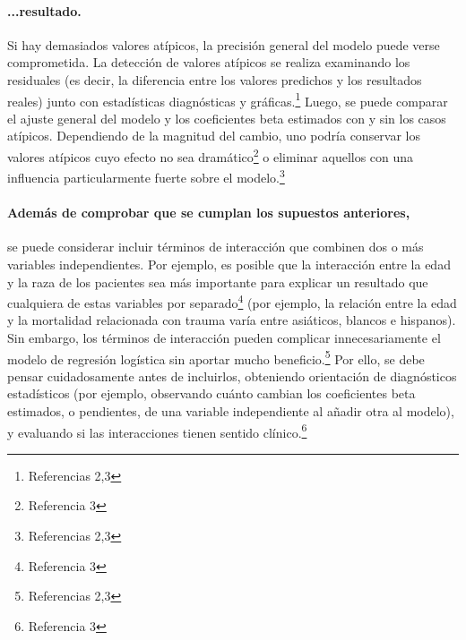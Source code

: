 \documentclass[12pt]{article}
\begin{document}
\begin{itemize}
\paragraph{...resultado.} Si hay demasiados valores at\'ipicos, la precisi\'on general del modelo puede verse comprometida. La detecci\'on de valores at\'ipicos se realiza examinando los residuales (es decir, la diferencia entre los valores predichos y los resultados reales) junto con estad\'isticas diagn\'osticas y gr\'aficas.\footnote{Referencias 2,3} Luego, se puede comparar el ajuste general del modelo y los coeficientes beta estimados con y sin los casos at\'ipicos. Dependiendo de la magnitud del cambio, uno podr\'ia conservar los valores at\'ipicos cuyo efecto no sea dram\'atico\footnote{Referencia 3} o eliminar aquellos con una influencia particularmente fuerte sobre el modelo.\footnote{Referencias 2,3}

\paragraph{Adem\'as de comprobar que se cumplan los supuestos anteriores,} se puede considerar incluir t\'erminos de interacci\'on que combinen dos o m\'as variables independientes. Por ejemplo, es posible que la interacci\'on entre la edad y la raza de los pacientes sea m\'as importante para explicar un resultado que cualquiera de estas variables por separado\footnote{Referencia 3} (por ejemplo, la relaci\'on entre la edad y la mortalidad relacionada con trauma var\'ia entre asi\'aticos, blancos e hispanos). Sin embargo, los t\'erminos de interacci\'on pueden complicar innecesariamente el modelo de regresi\'on log\'istica sin aportar mucho beneficio.\footnote{Referencias 2,3} Por ello, se debe pensar cuidadosamente antes de incluirlos, obteniendo orientaci\'on de diagn\'osticos estad\'isticos (por ejemplo, observando cu\'anto cambian los coeficientes beta estimados, o pendientes, de una variable independiente al a\~nadir otra al modelo), y evaluando si las interacciones tienen sentido cl\'inico.\footnote{Referencia 3}
\end{itemize}
\end{document}
